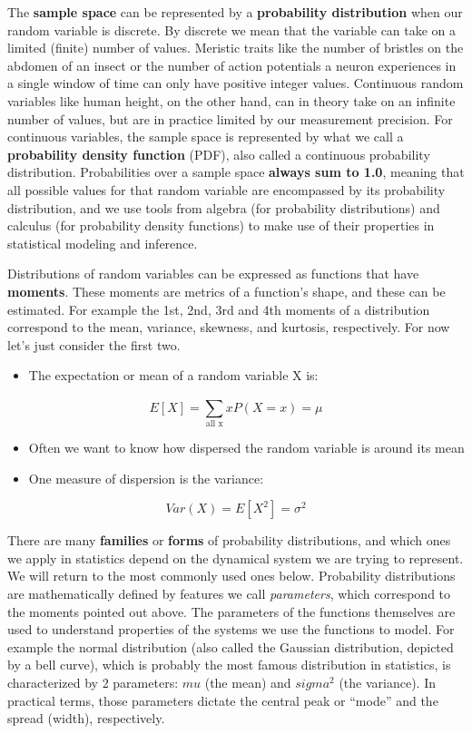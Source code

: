 \documentclass[
]{book}
\providecommand{\tightlist}{%
  \setlength{\itemsep}{0pt}\setlength{\parskip}{0pt}}
\begin{document}
The \textbf{sample space} can be represented by a \textbf{probability distribution} when our random variable is discrete. By discrete we mean that the variable can take on a limited (finite) number of values. Meristic traits like the number of bristles on the abdomen of an insect or the number of action potentials a neuron experiences in a single window of time can only have positive integer values. Continuous random variables like human height, on the other hand, can in theory take on an infinite number of values, but are in practice limited by our measurement precision. For continuous variables, the sample space is represented by what we call a \textbf{probability density function} (PDF), also called a continuous probability distribution. Probabilities over a sample space \textbf{always sum to 1.0}, meaning that all possible values for that random variable are encompassed by its probability distribution, and we use tools from algebra (for probability distributions) and calculus (for probability density functions) to make use of their properties in statistical modeling and inference.

Distributions of random variables can be expressed as functions that have \textbf{moments}. These moments are metrics of a function's shape, and these can be estimated. For example the 1st, 2nd, 3rd and 4th moments of a distribution correspond to the mean, variance, skewness, and kurtosis, respectively. For now let's just consider the first two.

\begin{itemize}
\tightlist
\item
  The expectation or mean of a random variable X is:
\end{itemize}

\[E[X] = \sum_{\text{all x}}^{}xP(X=x) = \mu\]

\begin{itemize}
\tightlist
\item
  Often we want to know how dispersed the random variable is around its mean
\item
  One measure of dispersion is the variance:
\end{itemize}

\[Var(X) = E[X^2] = \sigma^2\]

There are many \textbf{families} or \textbf{forms} of probability distributions, and which ones we apply in statistics depend on the dynamical system we are trying to represent. We will return to the most commonly used ones below. Probability distributions are mathematically defined by features we call \emph{parameters}, which correspond to the moments pointed out above. The parameters of the functions themselves are used to understand properties of the systems we use the functions to model. For example the normal distribution (also called the Gaussian distribution, depicted by a bell curve), which is probably the most famous distribution in statistics, is characterized by 2 parameters: \(mu\) (the mean) and \(sigma^{2}\) (the variance). In practical terms, those parameters dictate the central peak or ``mode'' and the spread (width), respectively.
\end{document}
